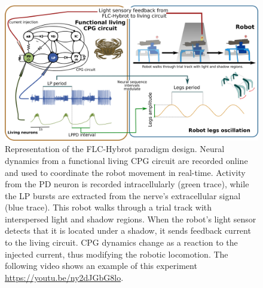 \begin{figure}[h!]
	\begin{center}
		\includegraphics[width=\linewidth]{img/invariants/robot/Figure1_experiment_design_v1.png}
	\end{center}
	\caption{Representation of the FLC-Hybrot paradigm design. Neural dynamics from a functional living CPG circuit are recorded online and used to coordinate the robot movement in real-time. Activity from the PD neuron is recorded intracellularly (green trace), while the LP bursts are extracted from the nerve's extracellular signal (blue trace). This robot walks through a trial track with interspersed light and shadow regions. When the robot's light sensor detects that it is located under a shadow, it sends feedback current to the living circuit. CPG dynamics change as a reaction to the injected current, thus modifying the robotic locomotion. The following video shows an example of this experiment \url{https://youtu.be/ny2dJGbG8lo}.}
	\label{fig:robot_results_summary}
\end{figure}




